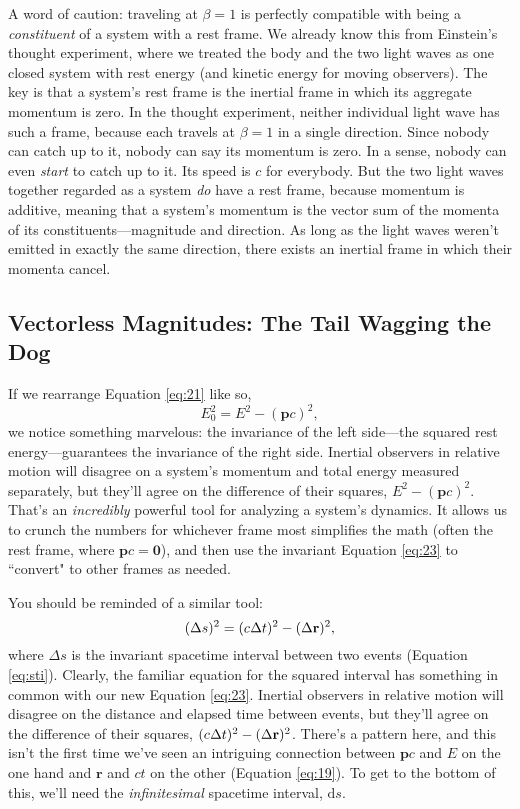 \documentclass[12pt]{article}
\renewcommand{\vv}[1]{\mathbf{#1}}
\newcommand{\dd}[1]{\mathrm{d}#1}
\begin{document}
A word of caution: traveling at $\beta = 1$ is perfectly compatible with being a \emph{constituent} of a system with a rest frame. We already know this from Einstein's thought experiment, where we treated the body and the two light waves as one closed system with rest energy (and kinetic energy for moving observers). The key is that a system's rest frame is the inertial frame in which its aggregate momentum is zero. In the thought experiment, neither individual light wave has such a frame, because each travels at $\beta = 1$ in a single direction. Since nobody can catch up to it, nobody can say its momentum is zero. In a sense, nobody can even \emph{start} to catch up to it. Its speed is $c$ for everybody. But the two light waves together regarded as a system \emph{do} have a rest frame, because momentum is additive, meaning that a system's momentum is the vector sum of the momenta of its constituents---magnitude and direction. As long as the light waves weren't emitted in exactly the same direction, there exists an inertial frame in which their momenta cancel.



\subsection{Vectorless Magnitudes: The Tail Wagging the Dog}

If we rearrange Equation \ref{eq:21} like so,
\begin{equation}\label{eq:23}
E_0^2=E^2-(\vv p c)^2,
\end{equation}
we notice something marvelous: the invariance of the left side---the squared rest energy---guarantees the invariance of the right side. Inertial observers in relative motion will disagree on a system's momentum and total energy measured separately, but they'll agree on the difference of their squares, $E^2-(\vv p c)^2$. That's an \emph{incredibly} powerful tool for analyzing a system's dynamics. It allows us to crunch the numbers for whichever frame most simplifies the math (often the rest frame, where $\vv p c = \vv 0$), and then use the invariant Equation \ref{eq:23} to ``convert" to other frames as needed.

You should be reminded of a similar tool:
\begin{equation*}
(\Delta s)^2 = (c \mkern.5mu \Delta t)^2 - (\Delta \vv r)^2,
\end{equation*}
where $\Delta s$ is the invariant spacetime interval between two events (Equation \ref{eq:sti}). Clearly, the familiar equation for the squared interval has something in common with our new Equation \ref{eq:23}. Inertial observers in relative motion will disagree on the distance and elapsed time between events, but they'll agree on the difference of their squares, $(c \mkern.5mu \Delta t)^2 - (\Delta \vv r)^2$. There's a pattern here, and this isn't the first time we've seen an intriguing connection between $\vv p c$ and $E$ on the one hand and $\vv r$ and $ct$ on the other (Equation \ref{eq:19}). To get to the bottom of this, we'll need the \emph{infinitesimal} spacetime interval, $\dd s$.
\end{document}
